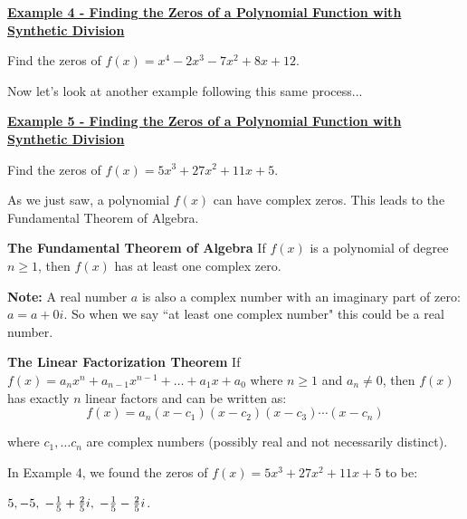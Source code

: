\documentclass[12pt]{book}
\newcommand{\D}{\displaystyle}
\begin{document}
\underline{\textbf{Example 4 - Finding the Zeros of a Polynomial Function with Synthetic Division}} 

Find the zeros of $\D f(x)=x^4-2x^3-7x^2+8x+12$.



\newpage
\textbf{ }
\vspace{210mm}

Now let's look at another example following this same process...
\newpage

\underline{\textbf{Example 5 - Finding the Zeros of a Polynomial Function with Synthetic Division}} 

Find the zeros of $f(x)=5x^3+27x^2+11x+5$. 


\newpage
As we just saw, a polynomial $f(x)$ can have complex zeros. This leads to the Fundamental Theorem of Algebra.

\begin{boxR}
    \textbf{The Fundamental Theorem of Algebra}
    \vspace{1mm}
    \hline
    \vspace{2mm}
    If $f(x)$ is a polynomial of degree $n \geq 1$, then $f(x)$ has at least one complex zero.
\end{boxR}

\textbf{Note:} A real number $a$ is also a complex number with an imaginary part of zero: $a=a+0i$. So when we say ``at least one complex number" this could be a real number.

\vspace{3mm}

\begin{boxR}
    \textbf{The Linear Factorization Theorem}
    \vspace{1mm}
    \hline
    \vspace{2mm}
    If $f(x)=a_nx^n + a_{n-1}x^{n-1}+ \ldots +a_1x+a_0$ where $n \geq 1$
and $a_n \neq 0$, then $f(x)$ has exactly $n$ linear factors and can be written as:
    $$f(x)=a_n(x-c_1)(x-c_2)(x-c_3)\cdots (x-c_n)$$

    where $c_1, \ldots c_n$ are complex numbers (possibly real and not necessarily distinct). 
    \end{boxR}





\vspace{10mm}
In Example 4, we found the zeros of $f(x)=5x^3+27x^2+11x+5$ to be:

$5, -5, \hspace{1mm} -\frac{1}{5}+ \frac{2}{5}i, \hspace{1mm} -\frac{1}{5} - \frac{2}{5}i$.
\vspace{5mm}
\end{document}
